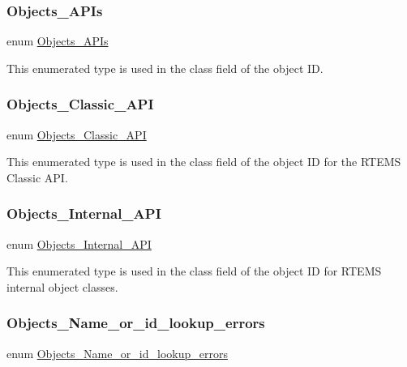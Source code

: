 \subsubsection{\texorpdfstring{Objects\_APIs}{Objects\_APIs}}
{\footnotesize\ttfamily enum \mbox{\hyperlink{group__RTEMSScoreObject_ga2d2636c8d2f1564f3e5b2b14e761574b}{Objects\+\_\+\+A\+P\+Is}}}

This enumerated type is used in the class field of the object ID. \mbox{\label{group__RTEMSScoreObject_gaea9b262405122fd6db22e869944b7632}} 
\subsubsection{\texorpdfstring{Objects\_Classic\_API}{Objects\_Classic\_API}}
{\footnotesize\ttfamily enum \mbox{\hyperlink{group__RTEMSScoreObject_gaea9b262405122fd6db22e869944b7632}{Objects\+\_\+\+Classic\+\_\+\+A\+PI}}}

This enumerated type is used in the class field of the object ID for the R\+T\+E\+MS Classic A\+PI. \mbox{\label{group__RTEMSScoreObject_gab0b081c60099c61c644af4cd5f70019f}} 
\subsubsection{\texorpdfstring{Objects\_Internal\_API}{Objects\_Internal\_API}}
{\footnotesize\ttfamily enum \mbox{\hyperlink{group__RTEMSScoreObject_gab0b081c60099c61c644af4cd5f70019f}{Objects\+\_\+\+Internal\+\_\+\+A\+PI}}}

This enumerated type is used in the class field of the object ID for R\+T\+E\+MS internal object classes. \mbox{\label{group__RTEMSScoreObject_gaccfeec04954711c389b10aeccc91cabe}} 
\subsubsection{\texorpdfstring{Objects\_Name\_or\_id\_lookup\_errors}{Objects\_Name\_or\_id\_lookup\_errors}}
{\footnotesize\ttfamily enum \mbox{\hyperlink{group__RTEMSScoreObject_gaccfeec04954711c389b10aeccc91cabe}{Objects\+\_\+\+Name\+\_\+or\+\_\+id\+\_\+lookup\+\_\+errors}}}

